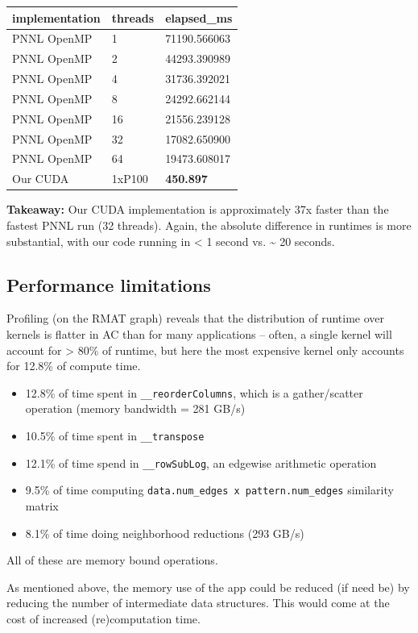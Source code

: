 \documentclass[10pt,oneside]{memoir}
\providecommand{\tightlist}{%
  \setlength{\itemsep}{0pt}\setlength{\parskip}{0pt}}
\begin{document}
\begin{longtable}[]{@{}lll@{}}
\toprule
implementation & threads & elapsed\_ms\tabularnewline
\midrule
\endhead
PNNL OpenMP & 1 & 71190.566063\tabularnewline
PNNL OpenMP & 2 & 44293.390989\tabularnewline
PNNL OpenMP & 4 & 31736.392021\tabularnewline
PNNL OpenMP & 8 & 24292.662144\tabularnewline
PNNL OpenMP & 16 & 21556.239128\tabularnewline
PNNL OpenMP & 32 & 17082.650900\tabularnewline
PNNL OpenMP & 64 & 19473.608017\tabularnewline
Our CUDA & 1xP100 & \textbf{450.897}\tabularnewline
\bottomrule
\end{longtable}

\textbf{Takeaway:} Our CUDA implementation is approximately 37x faster
than the fastest PNNL run (32 threads). Again, the absolute difference
in runtimes is more substantial, with our code running in \textless{} 1
second vs. \textasciitilde{} 20 seconds.

\hypertarget{performance-limitations}{%
\subsection{Performance limitations}\label{performance-limitations}}

Profiling (on the RMAT graph) reveals that the distribution of runtime
over kernels is flatter in AC than for many applications -- often, a
single kernel will account for \textgreater{} 80\% of runtime, but here
the most expensive kernel only accounts for 12.8\% of compute time.

\begin{itemize}
\tightlist
\item
  12.8\% of time spent in \texttt{\_\_reorderColumns}, which is a
  gather/scatter operation (memory bandwidth = 281 GB/s)
\item
  10.5\% of time spent in \texttt{\_\_transpose}
\item
  12.1\% of time spend in \texttt{\_\_rowSubLog}, an edgewise arithmetic
  operation
\item
  9.5\% of time computing
  \texttt{data.num\_edges\ x\ pattern.num\_edges} similarity matrix
\item
  8.1\% of time doing neighborhood reductions (293 GB/s)
\end{itemize}

All of these are memory bound operations.

As mentioned above, the memory use of the app could be reduced (if need
be) by reducing the number of intermediate data structures. This would
come at the cost of increased (re)computation time.
\end{document}
